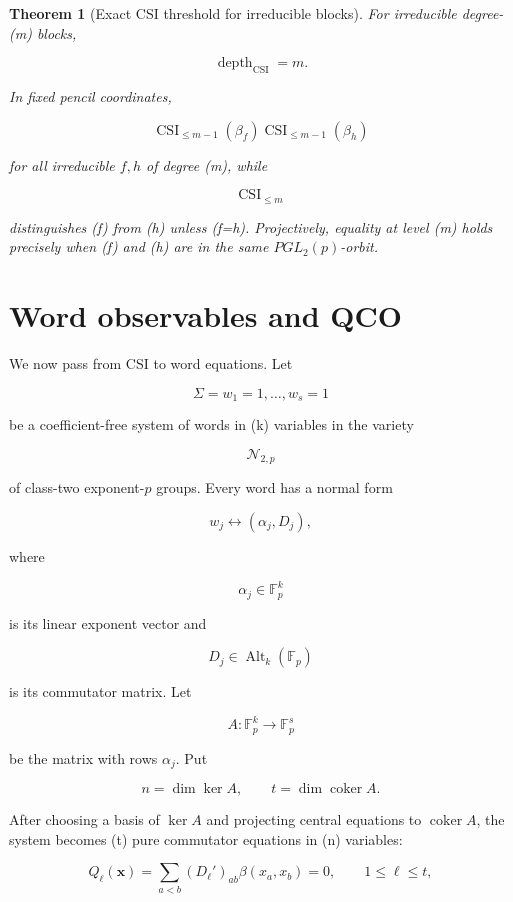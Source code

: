 \documentclass[11pt]{article}
\newtheorem{theorem}{Theorem}[section]
\begin{document}
\begin{theorem}[Exact CSI threshold for irreducible blocks]
For irreducible degree-(m) blocks,

\[
\operatorname{depth}_{\mathrm{CSI}}=m.
\]

In fixed pencil coordinates,

\[
\operatorname{CSI}_{\le m-1}(\beta_f)
\operatorname{CSI}_{\le m-1}(\beta_h)
\]

for all irreducible $f,h$ of degree (m), while

\[
\operatorname{CSI}_{\le m}
\]

distinguishes (f) from (h) unless (f=h). Projectively, equality at level (m) holds precisely when (f) and (h) are in the same $PGL_2(p)$-orbit.

\end{theorem}

\section{Word observables and QCO}

We now pass from CSI to word equations. Let

\[
\Sigma={w_1=1,\ldots,w_s=1}
\]

be a coefficient-free system of words in (k) variables in the variety

\[
\mathcal N_{2,p}
\]

of class-two exponent-$p$ groups. Every word has a normal form

\[
w_j
\longleftrightarrow
(\alpha_j,D_j),
\]

where

\[
\alpha_j\in\mathbb F_p^k
\]

is its linear exponent vector and

\[
D_j\in\operatorname{Alt}_k(\mathbb F_p)
\]

is its commutator matrix. Let

\[
A:\mathbb F_p^k\to\mathbb F_p^s
\]

be the matrix with rows $\alpha_j$. Put

\[
n=\dim\ker A,
\qquad
t=\dim\operatorname{coker}A.
\]

After choosing a basis of $\ker A$ and projecting central equations to $\operatorname{coker}A$, the system becomes (t) pure commutator equations in (n) variables:

\[
Q_\ell(\mathbf x)
=\sum_{a<b}(D_\ell')_{ab}\beta(x_a,x_b)
=0,
\qquad
1\le \ell\le t,
\tag{9.1}
\]
\end{document}

